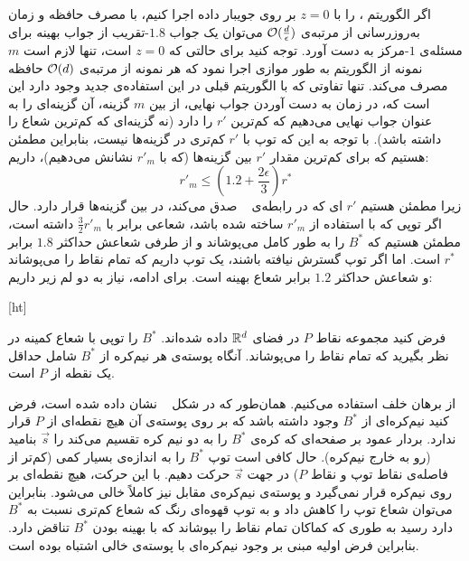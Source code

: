 اگر الگوریتم ، را با $z=0$ بر روی جویبار داده اجرا کنیم، با مصرف حافظه و زمان به‌روزرسانی از مرتبه‌ی $\mathcal{O}(\frac{d}{\epsilon})$ می‌توان یک جواب $1.8$-تقریب از جواب بهینه برای مسئله‌ی $1$-مرکز به دست آورد.
توجه کنید برای حالتی که $z=0$ است، تنها لازم است $m$ نمونه از الگوریتم   به طور موازی اجرا نمود که هر نمونه از مرتبه‌ی $\mathcal{O}(d)$ حافظه مصرف می‌کند.
تنها تفاوتی که با الگوریتم قبلی در این استفاده‌ی جدید وجود دارد این است که، در زمان به دست آوردن جواب نهایی، از بین $m$ گزینه، آن گزینه‌ای را به عنوان جواب نهایی می‌دهیم که کم‌ترین $r'$ را دارد (نه گزینه‌ای که کم‌ترین شعاع را داشته باشد).
با توجه به این که توپ با $r'$ کم‌تری در گزینه‌ها نیست، بنابراین مطمئن هستیم که برای کم‌ترین مقدار $r'$ بین گزینه‌ها (که با $r'_m$ نشانش می‌دهیم)، داریم:
$$r'_m \leq (1.2 + \frac{2\epsilon}{3})r^*$$
زیرا مطمئن هستیم $r'$ ای که در رابطه‌ی ~ صدق می‌کند، در بین گزینه‌ها قرار دارد.
حال اگر توپی که با استفاده از $r'_m$ ساخته شده باشد، شعاعی برابر با $\frac{3}{2}r'_m$ داشته است، مطمئن هستیم که $B^*$ را به طور کامل می‌پوشاند و از طرفی شعاعش حداکثر $1.8$ برابر $r^*$ است.
اما اگر توپ گسترش نیافته باشند، یک توپ داریم که تمام نقاط را می‌پوشاند و شعاعش حداکثر $1.2$ برابر شعاع بهینه است. برای ادامه، نیاز به دو لم زیر داریم:


[ht]


فرض کنید مجموعه نقاط $P$ در فضای $\mathbb{R}^d$ داده شده‌اند.
$B^*$
را توپی با شعاع کمینه در نظر بگیرید که تمام نقاط را می‌پوشاند.
آنگاه پوسته‌ی هر نیم‌کره از $B^*$ شامل حداقل یک نقطه از $P$ است.


از برهان خلف استفاده می‌کنیم.
همان‌طور که در شکل ~ نشان داده شده است، فرض کنید نیم‌کره‌ای از $B^*$ وجود داشته باشد که بر روی پوسته‌ی آن هیچ نقطه‌ای از $P$ قرار ندارد.
بردار عمود بر صفحه‌ای که کره‌ی $B^*$ را به دو نیم کره تقسیم می‌کند را $\vec{s}$ بنامید (رو به خارج نیم‌کره).
حال کافی است توپ $B^*$ را به اندازه‌ی بسیار کمی (کم‌تر از فاصله‌ی نقاط توپ و نقاط $P$) در جهت $\vec{s}$ حرکت دهیم.
با این حرکت، هیچ نقطه‌ای بر روی نیم‌کره قرار نمی‌گیرد و پوسته‌ی نیم‌کره‌ی مقابل نیز کاملاً خالی می‌شود.
بنابراین می‌توان شعاع توپ را کاهش داد و به توپ قهوه‌ای رنگ که شعاع کم‌تری نسبت به $B^*$ دارد رسید به طوری که کماکان تمام نقاط را بپوشاند که با بهینه بودن $B^*$ تناقض دارد.
بنابراین فرض اولیه مبنی بر وجود نیم‌کره‌ای با پوسته‌ی خالی اشتباه بوده است.

